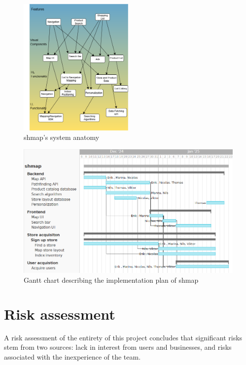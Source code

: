 \documentclass[titlepage]{article}
\def\companyName{shmap}
\begin{document}
\begin{figure}[h]
    \centering
    \includegraphics[width=0.5\textwidth]{SystemAnatomy.png}
    \caption{\companyName's system anatomy}
    \label{fig:sysanat}
\end{figure}

\begin{figure}[h]
    \centering
    \includegraphics[width=1\textwidth]{implementation_plan.png}
    \caption{Gantt chart describing the implementation plan of \companyName}
    \label{fig:ganttchart}
\end{figure}




\section{Risk assessment}

A risk assessment of the entirety of this project concludes that significant risks stem from two sources: lack in interest from users and businesses, and risks associated with the inexperience of the team.
\end{document}
